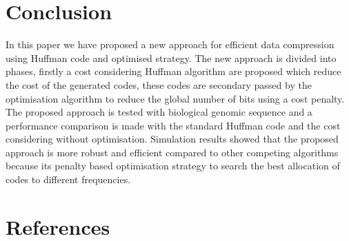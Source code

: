 \documentclass[preprint,12pt]{elsarticle}
\begin{document}
\section{Conclusion}
\label{sec5}
In this paper we have proposed a new approach for efficient data compression using Huffman code and optimised strategy. The new approach is divided into phases, firstly a cost considering Huffman algorithm are proposed which reduce the cost of the generated codes, these codes are secondary passed by the optimisation algorithm to reduce the global number of bits using a cost penalty.\\
The proposed approach is tested with biological genomic sequence and a performance comparison is made with the standard Huffman code and the cost considering without optimisation. Simulation results showed that the proposed approach is more robust and efficient compared to other competing algorithms because its penalty based optimisation strategy to search the best allocation of codes to different frequencies.






\newpage
\section*{References}

\end{document}
